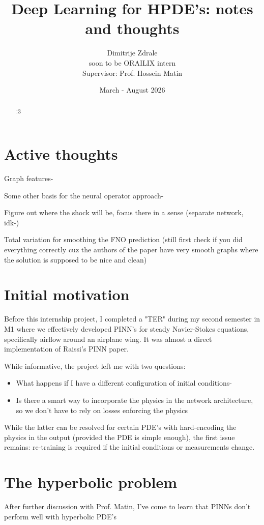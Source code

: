 \documentclass[11pt,a4paper]{article}
\title{Deep Learning for HPDE's: notes and thoughts}
\author{Dimitrije Zdrale \\
soon to be ORAILIX intern\\
Supervisor: Prof. Hossein Matin}
\date{March - August 2026}
\begin{document}
\maketitle

\begin{abstract}
:3
\end{abstract}
\section{Active thoughts}
Graph features-

Some other basis for the neural operator approach-

Figure out where the shock will be, focus there in a sense (separate network, idk-)

Total variation for smoothing the FNO prediction (still first check if you did everything correctly cuz the authors of the paper have very smooth graphs where the solution is supposed to be nice and clean)

\section{Initial motivation}

Before this internship project, I completed a "TER" during my second semester in M1 where we effectively developed PINN's for steady Navier-Stokes equations, specifically airflow around an airplane wing. It was almost a direct implementation of Raissi's PINN paper.~\cite{RAISSI}

While informative, the project left me with two questions:

\begin{itemize}
    \item {What happens if I have a different configuration of initial conditions-}
    \item {Is there a smart way to incorporate the physics in the network architecture, so we don't have to rely on losses enforcing the physics}
\end{itemize}
While the latter can be resolved for certain PDE's with hard-encoding the physics in the output (provided the PDE is simple enough), the first issue remains: re-training is required if the initial conditions or measurements change.
\section{The hyperbolic problem}
After further discussion with Prof. Matin, I've come to learn that PINNs don't perform well with hyperbolic PDE's
\end{document}
